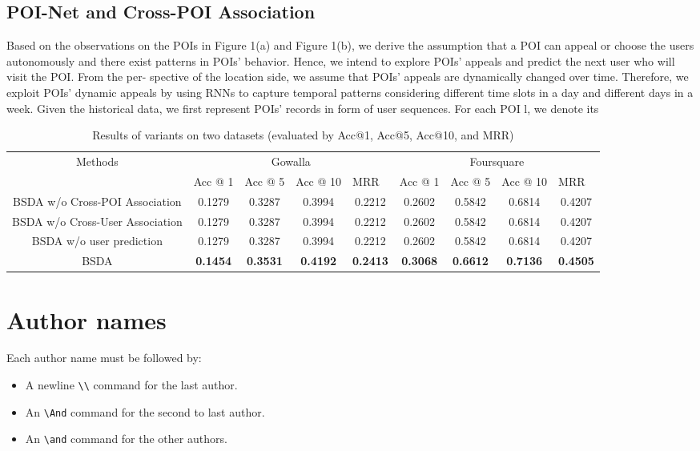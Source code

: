 \documentclass{article}
\begin{document}
\subsection{POI-Net and Cross-POI Association}
Based on the observations on the POIs in Figure 1(a) and
Figure 1(b), we derive the assumption that a POI can appeal
or choose the users autonomously and there exist patterns in
POIs’ behavior. Hence, we intend to explore POIs’ appeals
and predict the next user who will visit the POI. From the per-
spective of the location side, we assume that POIs’ appeals
are dynamically changed over time. Therefore, we exploit
POIs’ dynamic appeals by using RNNs to capture temporal
patterns considering different time slots in a day and different
days in a week.
Given the historical data, we first represent POIs’ records
in form of user sequences. For each POI l, we denote its


\begin{table*}[]
\begin{tabular}{c|cccc|cccc}
\hline
\multirow{2}{*}{Methods} & \multicolumn{4}{c|}{Gowalla} & \multicolumn{4}{c}{Foursquare}\\ \cline{2-9} & \multicolumn{1}{l}{Acc @ 1} & \multicolumn{1}{l}{Acc @ 5} & \multicolumn{1}{l}{Acc @ 10} & \multicolumn{1}{l|}{MRR} & \multicolumn{1}{l}{Acc @ 1} & \multicolumn{1}{l}{Acc @ 5} & \multicolumn{1}{l}{Acc @ 10} & \multicolumn{1}{l}{MRR} \\
\hline
BSDA w/o Cross-POI Association  & 0.1279 & 0.3287 & 0.3994 & 0.2212 & 0.2602 & 0.5842 & 0.6814 & 0.4207\\
BSDA w/o Cross-User Association & 0.1279  & 0.3287 & 0.3994 & 0.2212  & 0.2602 & 0.5842 & 0.6814 & 0.4207 \\
BSDA w/o user prediction  & 0.1279 & 0.3287  & 0.3994 & 0.2212  & 0.2602 & 0.5842 & 0.6814  & 0.4207 \\ 
\hline
BSDA & \textbf{0.1454} & \textbf{0.3531} & \textbf{0.4192}  & \textbf{0.2413}  & \textbf{0.3068} & \textbf{0.6612} & \textbf{0.7136}  & \textbf{0.4505}                 
\end{tabular}
\caption{Results of variants on two datasets (evaluated by Acc@1, Acc@5, Acc@10, and MRR)}
\label{tab:table2}
\end{table*}
\section{Author names}

Each author name must be followed by:
\begin{itemize}
    \item A newline {\tt \textbackslash{}\textbackslash{}} command for the last author.
    \item An {\tt \textbackslash{}And} command for the second to last author.
    \item An {\tt \textbackslash{}and} command for the other authors.
\end{itemize}
\end{document}
